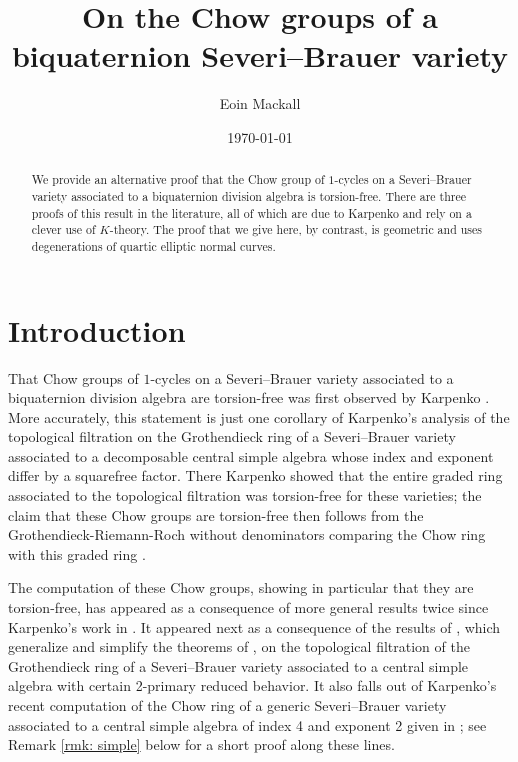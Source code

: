 \documentclass[12pt]{amsart}
\title[Chow groups of biquaternion SB-varieties]{On the Chow groups of a biquaternion Severi--Brauer variety}
\author{Eoin Mackall}
\date{\today}
\theoremstyle{definition}
\begin{document}
	\begin{abstract}
	 We provide an alternative proof that the Chow group of $1$-cycles on a Severi--Brauer variety associated to a biquaternion division algebra is torsion-free. There are three proofs of this result in the literature, all of which are due to Karpenko and rely on a clever use of $K$-theory. The proof that we give here, by contrast, is geometric and uses degenerations of quartic elliptic normal curves.
	\end{abstract}
	\maketitle
	
\section{Introduction}

That Chow groups of $1$-cycles on a Severi--Brauer variety associated to a biquaternion division algebra are torsion-free was first observed by Karpenko \cite{MR1386650}. More accurately, this statement is just one corollary of Karpenko's analysis of the topological filtration on the Grothendieck ring of a Severi--Brauer variety associated to a decomposable central simple algebra whose index and exponent differ by a squarefree factor. There Karpenko showed that the entire graded ring associated to the topological filtration was torsion-free for these varieties; the claim that these Chow groups are torsion-free then follows from the Grothendieck-Riemann-Roch without denominators comparing the Chow ring with this graded ring \cite[Example 15.3.6]{MR1644323}.

The computation of these Chow groups, showing in particular that they are torsion-free, has appeared as a consequence of more general results twice since Karpenko's work in \cite{MR1386650}. It appeared next as a consequence of the results of \cite{MR1615533}, which generalize and simplify the theorems of \cite{MR1327303}, on the topological filtration of the Grothendieck ring of a Severi--Brauer variety associated to a central simple algebra with certain 2-primary reduced behavior. It also falls out of Karpenko's recent computation of the Chow ring of a generic Severi--Brauer variety associated to a central simple algebra of index 4 and exponent 2 given in \cite{MR3581317}; see Remark \ref{rmk: simple} below for a short proof along these lines.
\end{document}
